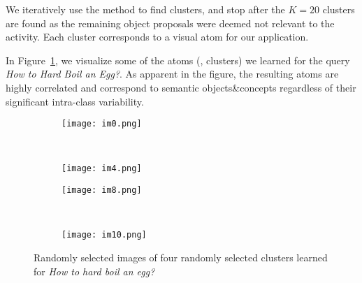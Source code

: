 We iteratively use the method to find clusters, and stop after the $K=20$ clusters are found as the remaining object proposals were deemed not relevant to the activity. Each cluster corresponds to a visual atom for our application.

In Figure~\ref{cvis}, we visualize some of the atoms (\ie, clusters) we learned for the query \emph{How to Hard Boil an Egg?}. As apparent in the figure, the resulting atoms are highly correlated and correspond to semantic objects\&concepts regardless of their significant intra-class variability.
\begin{figure}[ht]
  \begin{subfigure}[b]{0.23\textwidth}
\texttt{[image: im0.png]}
\end{subfigure}
~
\begin{subfigure}[b]{0.23\textwidth}
\texttt{[image: im4.png]}
\end{subfigure}


\begin{subfigure}[b]{0.23\textwidth}
\texttt{[image: im8.png]}
\end{subfigure}
~
\begin{subfigure}[b]{0.23\textwidth}
\texttt{[image: im10.png]}
\end{subfigure}
\caption{Randomly selected images of four randomly selected clusters learned for \emph{How to hard boil an egg?}}
\label{cvis}
\vspace{-3mm}
\end{figure}
